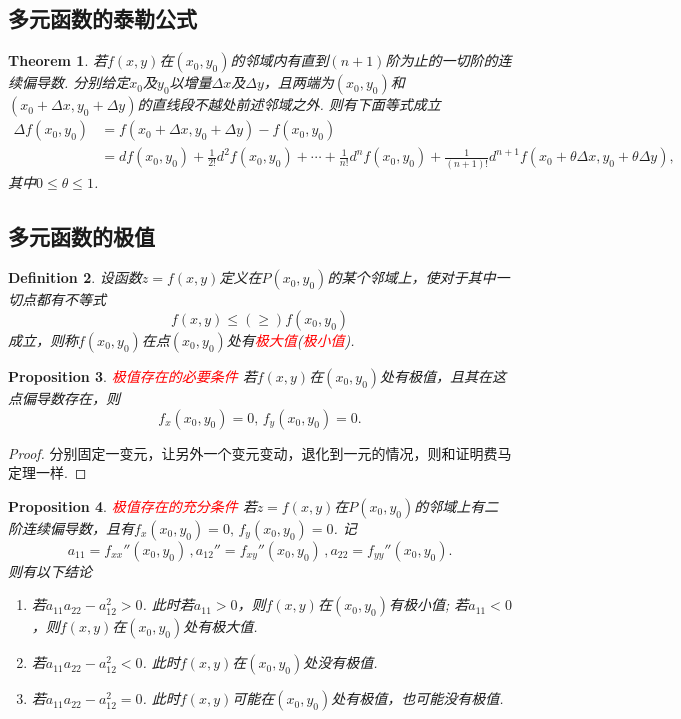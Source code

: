 \documentclass{article}
\newtheorem{theorem}{Theorem}[section]
\newtheorem{proposition}[theorem]{Proposition}
\newtheorem{definition}[theorem]{Definition}
\newcommand{\redt}[1]{\textcolor{red}{#1}}
\begin{document}
\subsection{多元函数的泰勒公式}

\begin{theorem}
\rm 若$f(x,y)$在$(x_0,y_0)$的邻域内有直到$(n+1)$阶为止的一切阶的连续偏导数. 分别给定$x_0$及$y_0$以增量$\Delta x$及$\Delta y$，且两端为$(x_0,y_0)$和$(x_0+\Delta x , y_0 + \Delta y)$的直线段不越处前述邻域之外. 则有下面等式成立
$$
\begin{array}{ll}
\Delta f(x_0,y_0) &= f(x_0 + \Delta x, y_0 + \Delta y)-f(x_0,y_0) \\
&= df(x_0,y_0) + \frac{1}{2!}d^2f(x_0,y_0) + \cdots + \frac{1}{n!}d^nf(x_0,y_0) + \frac{1}{(n+1)!}d^{n+1}f(x_0+\theta\Delta x, y_0 + \theta\Delta y),
\end{array}
$$
其中$0 \leq \theta \leq 1$. 
\end{theorem}


\subsection{多元函数的极值}

\begin{definition}
\rm 设函数$z=f(x,y)$定义在$P(x_0,y_0)$的某个邻域上，使对于其中一切点都有不等式
$$
f(x,y) \leq (\geq) f(x_0,y_0)
$$
成立，则称$f(x_0,y_0)$在点$(x_0,y_0)$处有\redt{极大值}(\redt{极小值}).
\end{definition}

\begin{proposition}
\rm \redt{极值存在的必要条件} 若$f(x,y)$在$(x_0,y_0)$处有极值，且其在这点偏导数存在，则
$$
f_x(x_0,y_0) = 0, \, f_y(x_0,y_0) = 0.
$$
\end{proposition}

\begin{proof}
分别固定一变元，让另外一个变元变动，退化到一元的情况，则和证明费马定理一样.
\end{proof}

\begin{proposition}
\rm \redt{极值存在的充分条件} 若$z=f(x,y)$在$P(x_0,y_0)$的邻域上有二阶连续偏导数，且有$f_x(x_0,y_0) = 0 ,\,f_y(x_0,y_0) = 0$. 记
$$
a_{11} = f_{xx}''(x_0,y_0)\,, a_{12}'' = f_{xy}''(x_0,y_0)\, , a_{22} = f_{yy}''(x_0,y_0).
$$
则有以下结论
\begin{enumerate}
	\item 若$a_{11}a_{22} - a_{12}^2 > 0$. 此时若$a_{11} > 0$，则$f(x,y)$在$(x_0,y_0)$有极小值; 若$a_{11} < 0$，则$f(x,y)$在$(x_0,y_0)$处有极大值.
	\item 若$a_{11}a_{22} - a_{12}^2 < 0$. 此时$f(x,y)$在$(x_0,y_0)$处没有极值.
	\item 若$a_{11}a_{22} - a_{12}^2 = 0$. 此时$f(x,y)$可能在$(x_0,y_0)$处有极值，也可能没有极值. 
\end{enumerate}
\end{proposition}
\end{document}
